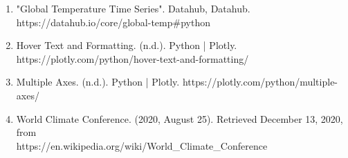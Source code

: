 \documentclass[fontsize=11pt]{article}
\begin{document}
\begin{enumerate}
        \item
        "Global Temperature Time Series". Datahub, Datahub. https://datahub.io/core/global-temp\#python
        \item
        Hover Text and Formatting. (n.d.). Python | Plotly. https://plotly.com/python/hover-text-and-formatting/
        \item
        Multiple Axes. (n.d.). Python | Plotly. https://plotly.com/python/multiple-axes/
        \item
        World Climate Conference. (2020, August 25). Retrieved December 13, 2020, from\\
        https://en.wikipedia.org/wiki/World\_Climate\_Conference
    \end{enumerate}

\end{document}

